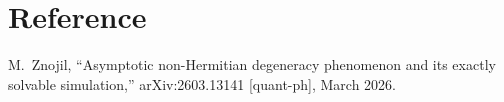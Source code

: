 \documentclass[11pt,a4paper]{article}
\begin{document}
\section*{Reference}
M.\ Znojil, ``Asymptotic non-Hermitian degeneracy phenomenon and its exactly solvable simulation,'' arXiv:2603.13141 [quant-ph], March 2026.
\end{document}
